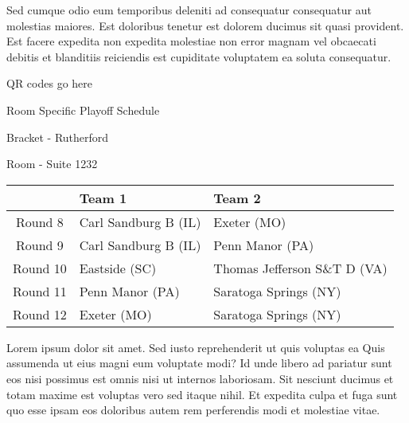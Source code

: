 \documentclass{article}%
\begin{document}
\newline%
Sed cumque odio eum temporibus deleniti ad consequatur consequatur aut molestias maiores. Est doloribus tenetur est dolorem ducimus sit quasi provident. Est facere expedita non expedita molestiae non error magnam vel obcaecati debitis et blanditiis reiciendis est cupiditate voluptatem ea soluta consequatur.%
\vspace*{140pt}%
\begin{center}%
\begin{Huge}%
QR codes go here%
\end{Huge}%
\end{center}%
\newpage%
\begin{center}%
\begin{Huge}%
Room Specific Playoff Schedule%
\end{Huge}%
\vspace*{8pt}%
\linebreak%
\begin{Large}%
Bracket {-} Rutherford%
\end{Large}%
\vspace*{8pt}%
\linebreak%
\vspace*{8pt}%
\begin{Large}%
Room {-} Suite 1232%
\end{Large}%
\end{center}%
%
\begin{tabularx}{\textwidth}{|c|Y|Y|}%
\hline%
&Team 1&Team 2\\%
\hline%
Round 8&Carl Sandburg B (IL)&Exeter (MO)\\%
Round 9&Carl Sandburg B (IL)&Penn Manor (PA)\\%
Round 10&Eastside (SC)&Thomas Jefferson S\&T D (VA)\\%
Round 11&Penn Manor (PA)&Saratoga Springs (NY)\\%
Round 12&Exeter (MO)&Saratoga Springs (NY)\\%
\hline%
\end{tabularx}%
\vspace*{8pt}%
\newline%
Lorem ipsum dolor sit amet. Sed iusto reprehenderit ut quis voluptas ea Quis assumenda ut eius magni eum voluptate modi? Id unde libero ad pariatur sunt eos nisi possimus est omnis nisi ut internos laboriosam. Sit nesciunt ducimus et totam maxime est voluptas vero sed itaque nihil. Et expedita culpa et fuga sunt quo esse ipsam eos doloribus autem rem perferendis modi et molestiae vitae.\newline%
\end{document}

